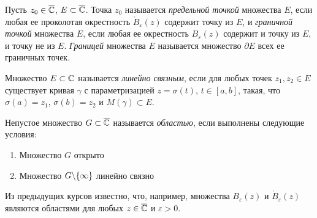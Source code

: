 \begin{definition}
	Пусть $z_0 \in \overline{\mathbb{C}}$, $E \subset \overline{\mathbb{C}}$. Точка $z_0$ называется \textit{предельной точкой} множества $E$, если любая ее проколотая окрестность $\mathring B_\varepsilon(z)$ содержит точку из $E$, и \textit{граничной точкой} множества $E$, если любая ее окрестность $B_\varepsilon(z)$ содержит и точку из $E$, и точку не из $E$. \textit{Границей} множества $E$ называется множество $\partial E$ всех ее граничных точек.
\end{definition}

\begin{definition}
	Множество $E \subset \mathbb{C}$ называется \textit{линейно связным}, если для любых точек $z_1, z_2 \in E$ существует кривая $\gamma$ с параметризацией $z = \sigma(t)$, $t \in [a, b]$, такая, что $\sigma(a) = z_1$, $\sigma(b) = z_2$ и $M(\gamma) \subset E$.
\end{definition}

\begin{definition}
	Непустое множество $G \subset \overline{\mathbb{C}}$ называется \textit{областью}, если выполнены следующие условия:
	\begin{enumerate}
		\item Множество $G$ открыто
		\item Множество $G \backslash \{\infty\}$ линейно связно
	\end{enumerate}
\end{definition}

\begin{note}
	Из предыдущих курсов известно, что, например, множества $B_\varepsilon(z)$ и $\mathring B_\varepsilon(z)$ являются областями для любых $z \in \overline{\mathbb{C}}$ и $\varepsilon > 0$.
\end{note}


